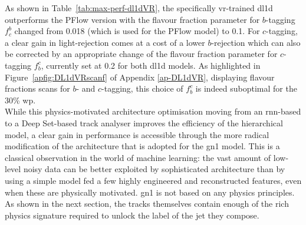 As shown in Table~\ref{tab:max-perf-dl1dVR}, the specifically \gls{vr}-trained \gls{dl1d} outperforms the PFlow version with the flavour fraction parameter for $b$-tagging $f^b_c$ changed from 0.018 (which is used for the PFlow model) to 0.1. For $c$-tagging, a clear gain in light-rejection comes at a cost of a lower $b$-rejection which can also be corrected by an appropriate change of the flavour fraction parameter for $c$-tagging $f^c_b$, currently set at 0.2 for both \gls{dl1d} models. As highlighted in Figure~\ref{apfig:DL1dVRscanf} of Appendix \ref{ap-DL1dVR}, displaying flavour fractions scans for $b$- and $c$-tagging, this choice of $f^c_b$ is indeed suboptimal for the 30\% \gls{wp}. \\

While this physics-motivated architecture optimisation moving from an \gls{rnn}-based to a Deep Set-based track analyser improves the efficiency of the hierarchical model, a clear gain in performance is accessible through the more radical modification of the architecture that is adopted for the \gls{gn1} model. This is a classical observation in the world of machine learning: the vast amount of low-level noisy data can be better exploited by sophisticated architecture than by using a simple model fed a few highly engineered and reconstructed features, even when these are physically motivated. \gls{gn1} is not based on any physics principles. As shown in the next section, the tracks themselves contain enough of the rich physics signature required to unlock the label of the jet they compose. 

